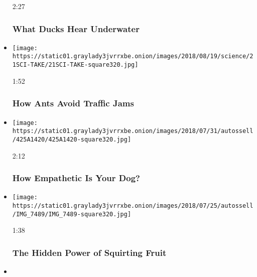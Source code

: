 \begin{itemize}
  2:27

  \hypertarget{what-ducks-hear-underwater}{%
  \subsubsection{What Ducks Hear
  Underwater}\label{what-ducks-hear-underwater}}
\item
  \href{https://www.nytimes3xbfgragh.onion/video/science/100000006037692/how-ants-avoid-traffic-jams.html?action=click\&module=video-series-bar\&region=header\&pgtype=Article\&playlistId=video/sciencetake}{}

  \texttt{[image: https://static01.graylady3jvrrxbe.onion/images/2018/08/19/science/21SCI-TAKE/21SCI-TAKE-square320.jpg]}

  1:52

  \hypertarget{how-ants-avoid-traffic-jams}{%
  \subsubsection{How Ants Avoid Traffic
  Jams}\label{how-ants-avoid-traffic-jams}}
\item
  \href{https://www.nytimes3xbfgragh.onion/video/science/100000006018081/how-empathetic-is-your-dog.html?action=click\&module=video-series-bar\&region=header\&pgtype=Article\&playlistId=video/sciencetake}{}

  \texttt{[image: https://static01.graylady3jvrrxbe.onion/images/2018/07/31/autossell/425A1420/425A1420-square320.jpg]}

  2:12

  \hypertarget{how-empathetic-is-your-dog}{%
  \subsubsection{How Empathetic Is Your
  Dog?}\label{how-empathetic-is-your-dog}}
\item
  \href{https://www.nytimes3xbfgragh.onion/video/science/100000005998094/the-hidden-power-of-squirting-fruit.html?action=click\&module=video-series-bar\&region=header\&pgtype=Article\&playlistId=video/sciencetake}{}

  \texttt{[image: https://static01.graylady3jvrrxbe.onion/images/2018/07/25/autossell/IMG\_7489/IMG\_7489-square320.jpg]}

  1:38

  \hypertarget{the-hidden-power-of-squirting-fruit}{%
  \subsubsection{The Hidden Power of Squirting
  Fruit}\label{the-hidden-power-of-squirting-fruit}}
\item
  \href{https://www.nytimes3xbfgragh.onion/video/science/100000005948406/how-spiders-use-silk-to-fly.html?action=click\&module=video-series-bar\&region=header\&pgtype=Article\&playlistId=video/sciencetake}{}


\end{itemize}
